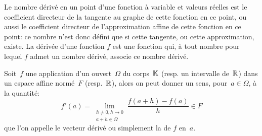 Le nombre dérivé en un point d'une fonction à variable et valeurs réelles est le coefficient directeur de la tangente au graphe de cette fonction en ce point, ou aussi le coefficient directeur de l'approximation affine de cette fonction en ce point: ce nombre n'est donc défini que si cette tangente, ou cette approximation, existe.
La dérivée d'une fonction $f$ est une fonction qui, à tout nombre pour lequel $f$ admet un nombre dérivé, associe ce nombre dérivé.
\begin{definition}
Soit~$f$ une application d'un ouvert~$\Omega$ du corps~$\mathbb K$ (resp. un intervalle de~$\mathbb R$) dans un espace affine normé~$F$ (resp.~$\mathbb R$), alors on peut donner un sens, pour~$a\in\Omega$, à la quantité:
\begin{equation}
f'(a)=\lim_{\substack{h\ne0,h\to0\\a+h\in\Omega}} \dfrac{f(a+h)-f(a)}h \in F
\end{equation}
que l'on appelle le vecteur dérivé ou simplement la  de $f$ en~$a$.
\end{definition}
\medskipvm

